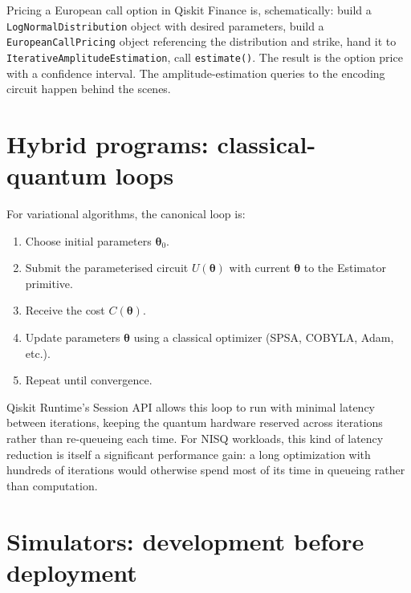 \begin{example}
Pricing a European call option in Qiskit Finance is, schematically: build a \texttt{LogNormalDistribution} object with desired parameters, build a \texttt{EuropeanCallPricing} object referencing the distribution and strike, hand it to \texttt{IterativeAmplitudeEstimation}, call \texttt{estimate()}. The result is the option price with a confidence interval. The amplitude-estimation queries to the encoding circuit happen behind the scenes.
\end{example}

\section{Hybrid programs: classical-quantum loops}

For variational algorithms, the canonical loop is:

\begin{enumerate}
  \item Choose initial parameters $\boldsymbol\theta_0$.
  \item Submit the parameterised circuit $U(\boldsymbol\theta)$ with current $\boldsymbol\theta$ to the Estimator primitive.
  \item Receive the cost $C(\boldsymbol\theta)$.
  \item Update parameters $\boldsymbol\theta$ using a classical optimizer (SPSA, COBYLA, Adam, etc.).
  \item Repeat until convergence.
\end{enumerate}

Qiskit Runtime's Session API allows this loop to run with minimal latency between iterations, keeping the quantum hardware reserved across iterations rather than re-queueing each time. For NISQ workloads, this kind of latency reduction is itself a significant performance gain: a long optimization with hundreds of iterations would otherwise spend most of its time in queueing rather than computation.

\section{Simulators: development before deployment}

